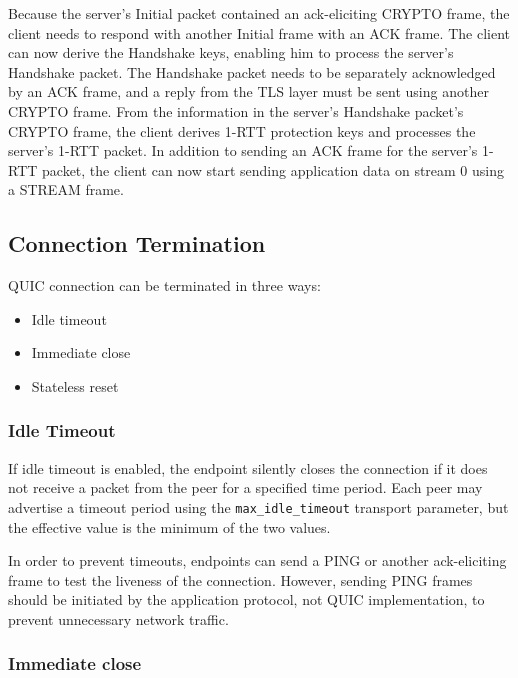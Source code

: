 Because the server's Initial packet contained an ack-eliciting CRYPTO frame, the client needs to
respond with another Initial frame with an ACK frame. The client can now derive the Handshake keys,
enabling him to process the server's Handshake packet. The Handshake packet needs to be separately
acknowledged by an ACK frame, and a reply from the TLS layer must be sent using another CRYPTO
frame. From the information in the server's Handshake packet's CRYPTO frame, the client derives
1-RTT protection keys and processes the server's 1-RTT packet. In addition to sending an ACK frame
for the server's 1-RTT packet, the client can now start sending application data on stream 0 using a
STREAM frame.

\subsection{Connection Termination}

QUIC connection can be terminated in three ways:

\begin{itemize}

  \item Idle timeout

  \item Immediate close

  \item Stateless reset

\end{itemize}

\subsubsection{Idle Timeout}

If idle timeout is enabled, the endpoint silently closes the connection if it does not receive a
packet from the peer for a specified time period. Each peer may advertise a timeout period using the
\texttt{max\_idle\_timeout} transport parameter, but the effective value is the minimum of the two
values.

In order to prevent timeouts, endpoints can send a PING or another ack-eliciting frame to test the
liveness of the connection. However, sending PING frames should be initiated by the application
protocol, not QUIC implementation, to prevent unnecessary network traffic.

\subsubsection{Immediate close}

